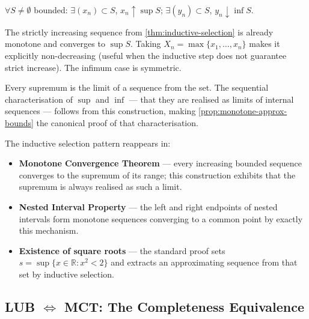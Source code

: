 \begin{remark}
$\forall S\neq\emptyset$ bounded:
$\exists(x_n)\subset S$, $x_n\uparrow\sup S$;\;
$\exists(y_n)\subset S$, $y_n\downarrow\inf S$.
\end{remark}

\begin{remark}
The strictly increasing sequence from \cref{thm:inductive-selection} is
already monotone and converges to $\sup S$. Taking $X_n=\max\{x_1,\ldots,x_n\}$
makes it explicitly non-decreasing (useful when the inductive step does
not guarantee strict increase). The infimum case is symmetric.
\end{remark}

\begin{remark}[Consequence]
Every supremum is the limit of a sequence from the set. The sequential
characterisation of $\sup$ and $\inf$ --- that they are realised as limits
of internal sequences --- follows from this construction, making
\cref{prop:monotone-approx-bounds} the canonical proof of that
characterisation.
\end{remark}

\begin{remark}
The inductive selection pattern reappears in:
\begin{itemize}
  \item \textbf{Monotone Convergence Theorem} --- every increasing bounded
        sequence converges to the supremum of its range; this construction
        exhibits that the supremum is always realised as such a limit.
  \item \textbf{Nested Interval Property} --- the left and right endpoints
        of nested intervals form monotone sequences converging to a common
        point by exactly this mechanism.
  \item \textbf{Existence of square roots} --- the standard proof sets
        $s=\sup\{x\in\mathbb{R}:x^2<2\}$ and extracts an approximating
        sequence from that set by inductive selection.
\end{itemize}
\end{remark}

\subsection*{\texorpdfstring{LUB $\Longleftrightarrow$ MCT: The Completeness Equivalence}{LUB Longleftrightarrow MCT: The Completeness Equivalence}}
\label{subsec:LUB-MCT}

